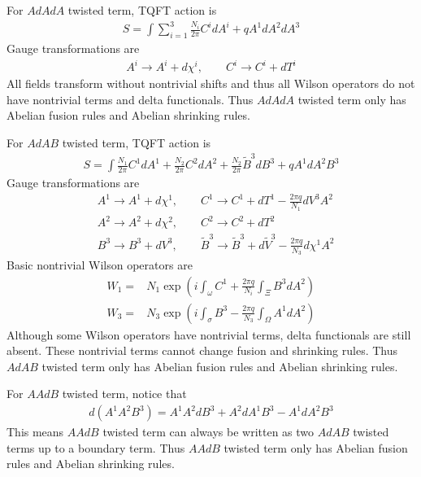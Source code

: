\documentclass[11pt,nofootinbib,preprint]{revtex4-1}
\begin{document}
For $AdAdA$ twisted term, TQFT action is
\begin{align}
	S=\int{\sum_{i=1}^3{\frac{N_i}{2\pi}C^idA^i+qA^1dA^2dA^3}}
\end{align}
Gauge transformations are 
\begin{align}
	A^i\rightarrow A^i+d\chi ^i,\qquad C^i\rightarrow C^i+dT^i
\end{align}
All fields transform without nontrivial shifts and thus all Wilson operators do not have nontrivial terms and delta functionals. Thus $AdAdA$ twisted term only has Abelian fusion rules and Abelian shrinking rules.

For $AdAB$ twisted term, TQFT action is
\begin{align}
	S=\int{\frac{N_1}{2\pi}C^1dA^1+\frac{N_2}{2\pi}C^2dA^2+\frac{N_2}{2\pi}\tilde{B}^3dB^3+qA^1dA^2B^3}
\end{align}
Gauge transformations are 
\begin{align}
	&A^1\rightarrow A^1+d\chi ^1,\qquad C^1\rightarrow C^1+dT^1-\frac{2\pi q}{N_1}dV^3A^2 \nonumber
	\\
	&A^2\rightarrow A^2+d\chi ^2,\qquad C^2\rightarrow C^2+dT^2 \nonumber
	\\
	&B^3\rightarrow B^3+dV^3,\qquad \tilde{B}^3\rightarrow \tilde{B}^3+d\tilde{V}^3-\frac{2\pi q}{N_3}d\chi ^1A^2
\end{align}
Basic nontrivial Wilson operators are
\begin{align}
	W_1=&N_1\exp \left( i\int_{\omega}{C^1+\frac{2\pi q}{N_i}}\int_{\Xi}{B^3dA^2} \right) \nonumber
	\\
	W_3=&N_3\exp \left( i\int_{\sigma}{B^3-\frac{2\pi q}{N_3}}\int_{\Omega}{A^1dA^2} \right) 
\end{align}
Although some Wilson operators have nontrivial terms, delta functionals are still absent. These nontrivial terms cannot change fusion and shrinking rules. Thus $AdAB$ twisted term only has Abelian fusion rules and Abelian shrinking rules.

For $AAdB$ twisted term, notice that 
\begin{align}
	d\left( A^1A^2B^3 \right) =A^1A^2dB^3+A^2dA^1B^3-A^1dA^2B^3
\end{align}
This means $AAdB$ twisted term can always be written as two $AdAB$ twisted terms up to a boundary term. Thus $AAdB$ twisted term only has Abelian fusion rules and Abelian shrinking rules.

%
\end{document}
